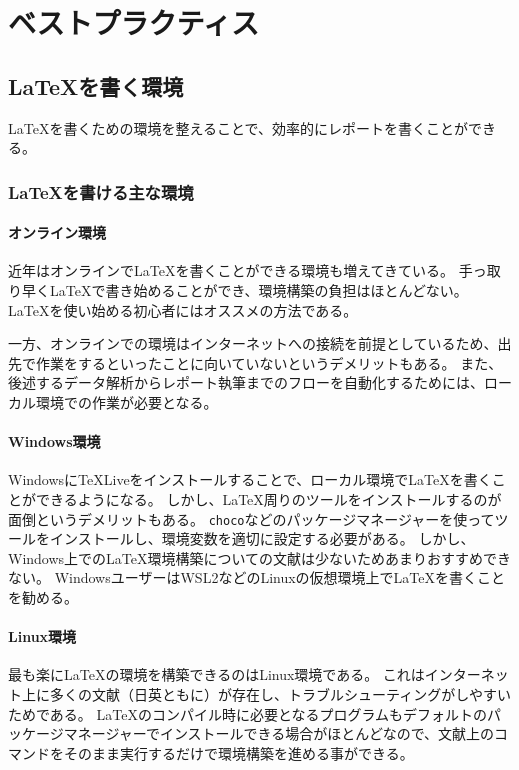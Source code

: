 \chapter{ベストプラクティス}
\label{chap:best-practices}

\section{\LaTeX を書く環境}

\LaTeX を書くための環境を整えることで、効率的にレポートを書くことができる。

\subsection{\LaTeX を書ける主な環境}
\subsubsection{オンライン環境}
近年はオンラインで\LaTeX を書くことができる環境も増えてきている。
手っ取り早く\LaTeX で書き始めることができ、環境構築の負担はほとんどない。
\LaTeX を使い始める初心者にはオススメの方法である。

一方、オンラインでの環境はインターネットへの接続を前提としているため、出先で作業をするといったことに向いていないというデメリットもある。
また、後述するデータ解析からレポート執筆までのフローを自動化するためには、ローカル環境での作業が必要となる。

\subsubsection{Windows環境}
Windowsに\TeX Liveをインストールすることで、ローカル環境で\LaTeX を書くことができるようになる。
しかし、\LaTeX 周りのツールをインストールするのが面倒というデメリットもある。
\verb|choco|などのパッケージマネージャーを使ってツールをインストールし、環境変数を適切に設定する必要がある。
しかし、Windows上での\LaTeX 環境構築についての文献は少ないためあまりおすすめできない。
WindowsユーザーはWSL2などのLinuxの仮想環境上で\LaTeX を書くことを勧める。

\subsubsection{Linux環境}
最も楽に\LaTeX の環境を構築できるのはLinux環境である。
これはインターネット上に多くの文献（日英ともに）が存在し、トラブルシューティングがしやすいためである。
\LaTeX のコンパイル時に必要となるプログラムもデフォルトのパッケージマネージャーでインストールできる場合がほとんどなので、文献上のコマンドをそのまま実行するだけで環境構築を進める事ができる。


